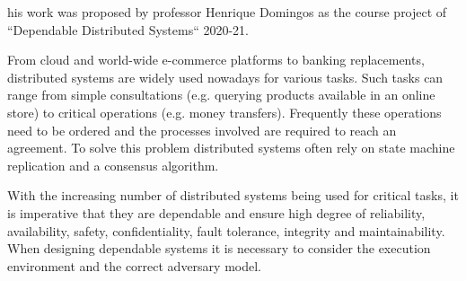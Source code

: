 \documentclass[10pt,journal,compsoc]{IEEEtran}
\begin{document}
	
	\maketitle
	\IEEEdisplaynontitleabstractindextext
	
	
	\IEEEpeerreviewmaketitle


	his work was proposed by professor Henrique Domingos as the course project of “Dependable Distributed Systems“ 2020-21.

	From cloud and world-wide e-commerce platforms to banking replacements, distributed systems are widely used nowadays for various tasks.
	Such tasks can range from simple consultations (e.g. querying products available in an online store) to critical operations (e.g. money transfers). Frequently these operations need to be ordered and the processes involved are required to reach an agreement. To solve this problem distributed systems often rely on state machine replication and a consensus algorithm.

	With the increasing number of distributed systems being used for critical tasks, it is imperative that they are dependable and ensure high degree of reliability, availability, safety, confidentiality, fault tolerance, integrity and maintainability. When designing dependable systems it is necessary to consider the execution environment and the correct adversary model.
	
\end{document}
